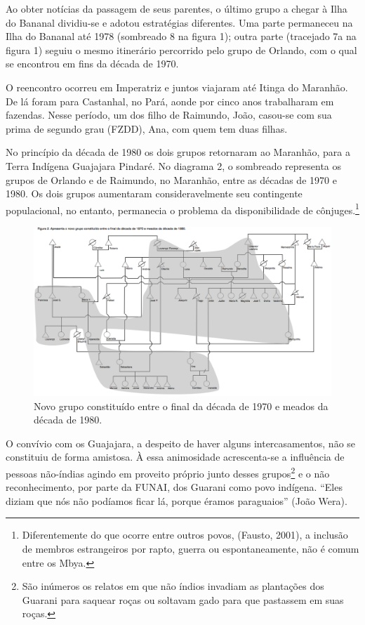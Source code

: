 Ao obter notícias da passagem de seus parentes, o último grupo a chegar
à Ilha do Bananal dividiu-se e adotou estratégias diferentes. Uma parte
permaneceu na Ilha do Bananal até 1978 (sombreado 8 na figura 1); outra
parte (tracejado 7a na figura 1) seguiu o mesmo itinerário percorrido
pelo grupo de Orlando, com o qual se encontrou em fins da década de
1970.

O reencontro ocorreu em Imperatriz e juntos viajaram até Itinga do
Maranhão. De lá foram para Castanhal, no Pará, aonde por cinco anos
trabalharam em fazendas. Nesse período, um dos filho de Raimundo, João,
casou-se com sua prima de segundo grau (FZDD), Ana, com quem tem duas
filhas.

No princípio da década de 1980 os dois grupos retornaram ao Maranhão,
para a Terra Indígena Guajajara Pindaré. No diagrama 2, o sombreado
representa os grupos de Orlando e de Raimundo, no Maranhão, entre as
décadas de 1970 e 1980. Os dois grupos aumentaram consideravelmente seu
contingente populacional, no entanto, permanecia o problema da
disponibilidade de cônjuges.\footnote{Diferentemente do que ocorre
entre outros povos, (Fausto, 2001), a inclusão de membros estrangeiros
por rapto, guerra ou espontaneamente, não é comum entre os Mbya.}

\begin{figure}
  \centering
 \includegraphics[width=\textwidth]{./img/GUARANIS-img10.png}	
  \hfill
  \caption{Novo grupo constituído entre o final da década de 1970 e meados da década de 1980.}
\end{figure}
 
 

O convívio com os Guajajara, a despeito de haver alguns intercasamentos,
não se constituiu de forma amistosa. À essa animosidade acrescenta-se a
influência de pessoas não-índias agindo em proveito próprio junto
desses grupos\footnote{São inúmeros os relatos em que não índios
invadiam as plantações dos Guarani para saquear roças ou soltavam gado
para que pastassem em suas roças.} e o não reconhecimento, por parte da
FUNAI, dos Guarani como povo indígena. ``Eles diziam que nós não
podíamos ficar lá, porque éramos paraguaios'' (João Wera). 


